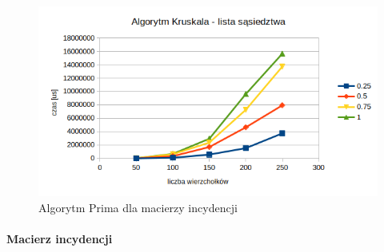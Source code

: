 \documentclass[11pt]{article}
\begin{document}
\begin{figure}[H]
    \includegraphics[width=13cm]{images/kruskallista.png}
    \caption{ Algorytm Prima dla    macierzy incydencji}
\end{figure}
\paragraph{Macierz incydencji}
\end{document}
